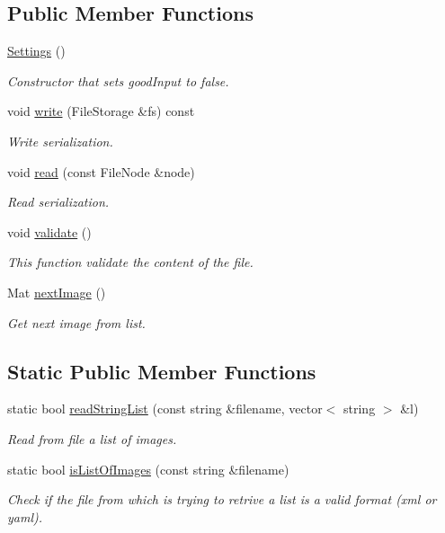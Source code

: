\subsection*{Public Member Functions}
\begin{DoxyCompactItemize}
\item 
\mbox{\hyperlink{class_settings_ab7169a6eefce79566dd07db3b1e5e967}{Settings}} ()
\begin{DoxyCompactList}\small\item\em Constructor that sets {\ttfamily good\+Input} to false. \end{DoxyCompactList}\item 
void \mbox{\hyperlink{class_settings_a0785cc2055091b2a857b1dcefe291acc}{write}} (File\+Storage \&fs) const
\begin{DoxyCompactList}\small\item\em Write serialization. \end{DoxyCompactList}\item 
void \mbox{\hyperlink{class_settings_a2d7841f8441095032e0f3b7d20adfd3f}{read}} (const File\+Node \&node)
\begin{DoxyCompactList}\small\item\em Read serialization. \end{DoxyCompactList}\item 
void \mbox{\hyperlink{class_settings_a29016205c90b95d6247df18365a70dd0}{validate}} ()
\begin{DoxyCompactList}\small\item\em This function validate the content of the file. \end{DoxyCompactList}\item 
Mat \mbox{\hyperlink{class_settings_a7701462e928f2425b342440fba9973e5}{next\+Image}} ()
\begin{DoxyCompactList}\small\item\em Get next image from list. \end{DoxyCompactList}\end{DoxyCompactItemize}
\subsection*{Static Public Member Functions}
\begin{DoxyCompactItemize}
\item 
static bool \mbox{\hyperlink{class_settings_ab5f7cb92b11b6d324d9994ebcc2efa3f}{read\+String\+List}} (const string \&filename, vector$<$ string $>$ \&l)
\begin{DoxyCompactList}\small\item\em Read from file a list of images. \end{DoxyCompactList}\item 
static bool \mbox{\hyperlink{class_settings_af5003738fba7def4d4d9850a08eecacb}{is\+List\+Of\+Images}} (const string \&filename)
\begin{DoxyCompactList}\small\item\em Check if the file from which is trying to retrive a list is a valid format (xml or yaml). \end{DoxyCompactList}\end{DoxyCompactItemize}
